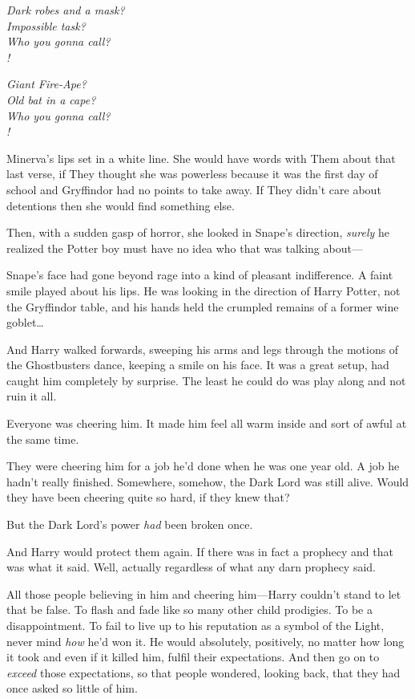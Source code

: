 \begin{center}
\emph{Dark robes and a mask?\\
Impossible task?\\
Who you gonna call?\\
!}

\emph{Giant Fire-Ape?\\
Old bat in a cape?\\
Who you gonna call?\\
!}
\end{center}

Minerva's lips set in a white line. She would have words with Them about that last verse, if They thought she was powerless because it was the first day of school and Gryffindor had no points to take away. If They didn't care about detentions then she would find something else.

Then, with a sudden gasp of horror, she looked in Snape's direction, \emph{surely} he realized the Potter boy must have no idea who that was talking about—

Snape's face had gone beyond rage into a kind of pleasant indifference. A faint smile played about his lips. He was looking in the direction of Harry Potter, not the Gryffindor table, and his hands held the crumpled remains of a former wine goblet{\ldots}

And Harry walked forwards, sweeping his arms and legs through the motions of the Ghostbusters dance, keeping a smile on his face. It was a great setup, had caught him completely by surprise. The least he could do was play along and not ruin it all.

Everyone was cheering him. It made him feel all warm inside and sort of awful at the same time.

They were cheering him for a job he'd done when he was one year old. A job he hadn't really finished. Somewhere, somehow, the Dark Lord was still alive. Would they have been cheering quite so hard, if they knew that?

But the Dark Lord's power \emph{had} been broken once.

And Harry would protect them again. If there was in fact a prophecy and that was what it said. Well, actually regardless of what any darn prophecy said.

All those people believing in him and cheering him—Harry couldn't stand to let that be false. To flash and fade like so many other child prodigies. To be a disappointment. To fail to live up to his reputation as a symbol of the Light, never mind \emph{how} he'd won it. He would absolutely, positively, no matter how long it took and even if it killed him, fulfil their expectations. And then go on to \emph{exceed} those expectations, so that people wondered, looking back, that they had once asked so little of him.

